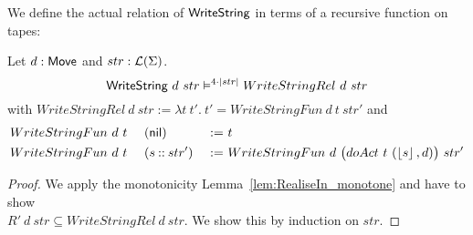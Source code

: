 We define the actual relation of $\textsf{WriteString}$ in terms of a recursive function on tapes:
\begin{lemma}
  \label{lem:WriteString_Sem}
  Let $d:\textsf{Move}$ and $str:\mathcal{L}(\Sigma)$.
  \[ \textsf{WriteString}~d~str \vDash^{4\cdot\left| str \right|} WriteStringRel~d~str \]
  with
  $WriteStringRel~d~str := \lambda t~t'.~t' = WriteStringFun~d~t~str'$ and
  \begin{alignat*}{3}
    &WriteStringFun~d~t~&&(\textsf{nil}        ) &~:=~& t \\
    &WriteStringFun~d~t~&&(s \mathbin{::} str') &~:=~& WriteStringFun~d~\bigl(doAct~t~(\left\lfloor {s} \right\rfloor, d)\bigr)~str'
  \end{alignat*}
\end{lemma}
\begin{proof}
  We apply the monotonicity Lemma~\ref{lem:RealiseIn_monotone} and have to show\\
  $R'~d~str \subseteq WriteStringRel~d~str$.  We show this by induction on $str$.
\end{proof}



